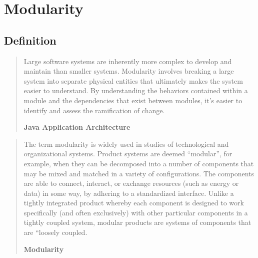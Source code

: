 \section{Modularity}
\label{sec:modularity}

\subsection{Definition}

\begin{quote}
Large software systems are inherently more complex to develop and maintain than smaller systems. Modularity involves breaking a large system into separate physical entities that ultimately makes the system easier to understand. By understanding the behaviors contained within a module and the dependencies that exist between modules, it’s easier to identify and assess the ramification of change.

\hfill \textbf{Java Application Architecture}

\hfill \citeauthor{Knoernschild:2012} \cite{Knoernschild:2012}
\end{quote}

\begin{quote}
The term modularity is widely used in studies of technological and organizational systems. Product systems are deemed “modular”, for example, when they can be decomposed into a number of components that may be mixed and matched in a variety of configurations. The components are able to connect, interact, or exchange resources (such as energy or data) in some way, by adhering to a standardized interface. Unlike a tightly integrated product whereby each component is designed to work specifically (and often exclusively) with other particular components in a tightly coupled system, modular products are systems of components that are “loosely coupled.

\hfill \textbf{Modularity}

\hfill \citeauthor{Wikipedia:Modularity:2012} \cite{Wikipedia:Modularity:2012}

\end{quote}

\newpage

